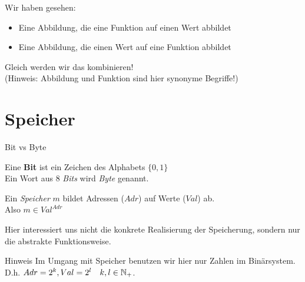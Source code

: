\begin{frame}
	Wir haben gesehen:
	\begin{itemize}
		\item Eine Abbildung, die eine Funktion auf einen Wert abbildet
		\item Eine Abbildung, die einen Wert auf eine Funktion abbildet
	\end{itemize}
	Gleich werden wir das kombinieren!\\[1em]
	(Hinweis: Abbildung und Funktion sind hier synonyme Begriffe!)
\end{frame}

\section{Speicher}

\begin{frame}{Bit vs Byte}
	\begin{Definition}
		Eine \textbf{Bit} ist ein Zeichen des Alphabets $\{0, 1\}$ \\
		Ein Wort aus 8 \emph{Bits} wird \emph{Byte} genannt. 
	\end{Definition}
	\pause	
	
	\begin{Definition}
		Ein \emph{Speicher} $m$ bildet Adressen ($Adr$) auf Werte ($Val$) ab.\\
		Also $m \in Val^{Adr}$
	\end{Definition}
	Hier interessiert uns nicht die konkrete Realisierung der Speicherung, sondern nur die abstrakte Funktionsweise.
	\pause
	
	\begin{block}{Hinweis}
		Im Umgang mit Speicher benutzen wir hier nur Zahlen im Binärsystem. \\
		D.h. $Adr = 2^k, Val = 2^l \quad k,l \in \mathbb{N}_+$. 
	\end{block}
\end{frame}

